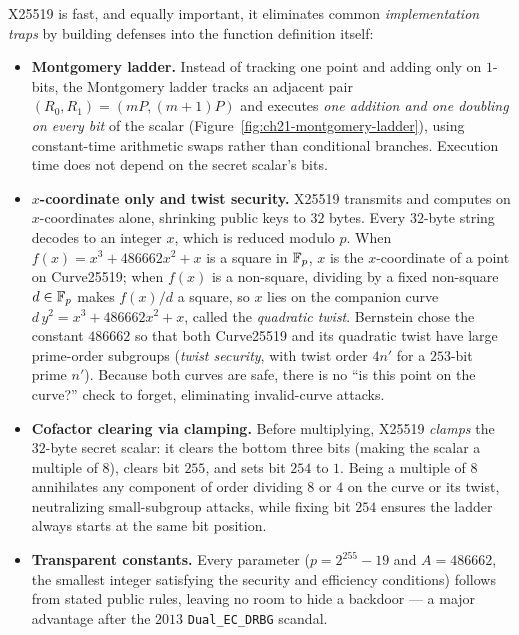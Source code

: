 \begin{aestheticbox}
X25519 is fast, and equally important, it eliminates common \emph{implementation traps}
by building defenses into the function definition itself:
\begin{itemize}
  \item \textbf{Montgomery ladder.} Instead of tracking one point and adding only on
        $1$-bits, the Montgomery ladder tracks an adjacent pair $(R_0, R_1) = (mP, (m+1)P)$
        and executes \emph{one addition and one doubling on every bit} of the scalar
        (Figure~\ref{fig:ch21-montgomery-ladder}), using constant-time arithmetic swaps
        rather than conditional branches. Execution time does not depend on the secret
        scalar's bits.
  \item \textbf{$x$-coordinate only and twist security.} X25519 transmits and computes on
        $x$-coordinates alone, shrinking public keys to $32$ bytes. Every $32$-byte string
        decodes to an integer $x$, which is reduced modulo $p$. When $f(x) = x^3 + 486662x^2 + x$
        is a square in $\mathbb{F}_p$, $x$ is the $x$-coordinate of a point on Curve25519; when
        $f(x)$ is a non-square, dividing by a fixed non-square $d \in \mathbb{F}_p$ makes $f(x)/d$
        a square, so $x$ lies on the companion curve $d\,y^2 = x^3 + 486662x^2 + x$, called
        the \emph{quadratic twist}. Bernstein chose the constant $486662$ so that both
        Curve25519 and its quadratic twist have large prime-order subgroups (\emph{twist
        security}, with twist order $4n'$ for a $253$-bit prime $n'$). Because both curves
        are safe, there is no ``is this point on the curve?'' check to forget, eliminating
        invalid-curve attacks.
  \item \textbf{Cofactor clearing via clamping.} Before multiplying, X25519 \emph{clamps}
        the $32$-byte secret scalar: it clears the bottom three bits (making the scalar a
        multiple of $8$), clears bit $255$, and sets bit $254$ to $1$. Being a multiple of
        $8$ annihilates any component of order dividing $8$ or $4$ on the curve or its
        twist, neutralizing small-subgroup attacks, while fixing bit $254$ ensures the
        ladder always starts at the same bit position.
  \item \textbf{Transparent constants.} Every parameter ($p = 2^{255}-19$ and $A = 486662$,
        the smallest integer satisfying the security and efficiency conditions) follows
        from stated public rules, leaving no room to hide a backdoor --- a major advantage
        after the $2013$ \texttt{Dual\_EC\_DRBG} scandal.
\end{itemize}
\end{aestheticbox}

